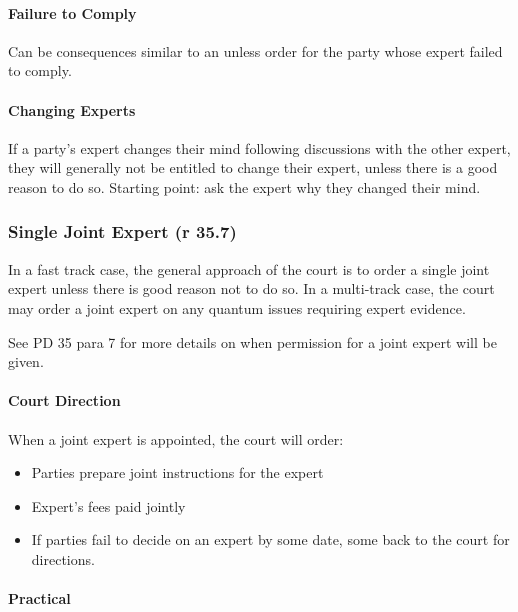 \documentclass[
]{article}
\providecommand{\tightlist}{%
  \setlength{\itemsep}{0pt}\setlength{\parskip}{0pt}}
\begin{document}
\hypertarget{failure-to-comply-1}{%
\paragraph{Failure to Comply}\label{failure-to-comply-1}}

Can be consequences similar to an unless order for the party whose
expert failed to comply.

\hypertarget{changing-experts}{%
\paragraph{Changing Experts}\label{changing-experts}}

If a party's expert changes their mind following discussions with the
other expert, they will generally not be entitled to change their
expert, unless there is a good reason to do so. Starting point: ask the
expert why they changed their mind.

\hypertarget{single-joint-expert-r-35.7}{%
\subsubsection{Single Joint Expert (r
35.7)}\label{single-joint-expert-r-35.7}}

In a fast track case, the general approach of the court is to order a
single joint expert unless there is good reason not to do so. In a
multi-track case, the court may order a joint expert on any quantum
issues requiring expert evidence.

See PD 35 para 7 for more details on when permission for a joint expert
will be given.

\hypertarget{court-direction-1}{%
\paragraph{Court Direction}\label{court-direction-1}}

When a joint expert is appointed, the court will order:

\begin{itemize}
\tightlist
\item
  Parties prepare joint instructions for the expert
\item
  Expert's fees paid jointly
\item
  If parties fail to decide on an expert by some date, some back to the
  court for directions.
\end{itemize}

\hypertarget{practical}{%
\paragraph{Practical}\label{practical}}
\end{document}
